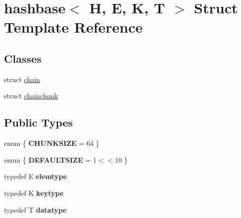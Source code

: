 \hypertarget{structhashbase}{}\section{hashbase$<$ H, E, K, T $>$ Struct Template Reference}
\label{structhashbase}
\subsection*{Classes}
\begin{DoxyCompactItemize}
\item 
struct \hyperlink{structhashbase_1_1chain}{chain}
\item 
struct \hyperlink{structhashbase_1_1chainchunk}{chainchunk}
\end{DoxyCompactItemize}
\subsection*{Public Types}
\begin{DoxyCompactItemize}
\item 
\mbox{\label{structhashbase_a23d764580f45007f5e835976cb86e07c}} 
enum \{ {\bfseries C\+H\+U\+N\+K\+S\+I\+ZE} = 64
 \}
\item 
\mbox{\label{structhashbase_af9b3b2fac33b501ffe9bc31f3ee53a4c}} 
enum \{ {\bfseries D\+E\+F\+A\+U\+L\+T\+S\+I\+ZE} = 1$<$$<$10
 \}
\item 
\mbox{\label{structhashbase_a6cb82d402e0c7d9bd770722d8d1eb6df}} 
typedef E {\bfseries elemtype}
\item 
\mbox{\label{structhashbase_a1d6055f94835a81eae6fd7f70d180f1e}} 
typedef K {\bfseries keytype}
\item 
\mbox{\label{structhashbase_ae97da04ae671d9246ddd1326f3931f78}} 
typedef T {\bfseries datatype}
\end{DoxyCompactItemize}
